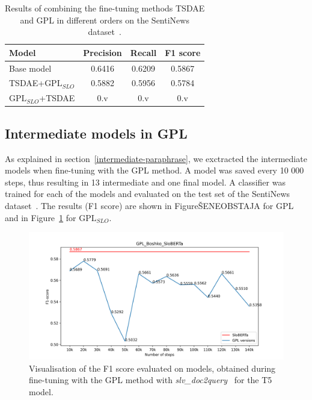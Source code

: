 \documentclass[fleqn,moreauthors,10pt]{ds_report}
\begin{document}
\begin{table}[!h]
	\footnotesize
	\begin{center}
		\begin{tabular}{ |l|c|c|c| }
		\hline
		\rowcolor{Blue}Model & Precision & Recall & F1 score\\
		\hline

		Base model & 0.6416 & 0.6209 & 0.5867\\
		TSDAE+$\text{GPL}_{SLO}$ & 0.5882 & 0.5956 & 0.5784\\
		$\text{GPL}_{SLO}$+TSDAE & 0.v & 0.v & 0.v\\

		\hline
		\end{tabular}
	\end{center}
\caption{Results of combining the fine-tuning methods TSDAE and GPL in different orders on the SentiNews dataset~\cite{sentiNews}.}
\label{tab5}
\end{table}



\subsection*{Intermediate models in GPL}
As explained in section~\ref{intermediate-paraphrase}, we exctracted the intermediate models when fine-tuning with the GPL method. A model was saved every 10 000 steps, thus resulting in 13 intermediate and one final model. A classifier was trained for each of the models and evaluated on the test set of the SentiNews dataset~\cite{sentiNews}. The results (F1 score) are shown in FigureŠENEOBSTAJA for GPL and in Figure~\ref{fig:gpl-slo-sloberta-versions} for $\text{GPL}_{SLO}$.

\begin{figure}[ht]\centering
	\vspace{12 pt}
	\includegraphics[width=\linewidth]{GPL_Boshko_SloBERTa.png}
	\vspace{5 pt}
	\caption{Visualisation of the F1 score evaluated on models, obtained during fine-tuning with the GPL method with {\it slv\_doc2query}~\cite{boshko} for the T5 model.}
	\label{fig:gpl-slo-sloberta-versions}
\end{figure}
\end{document}
